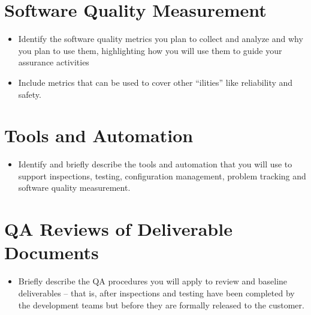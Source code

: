 \documentclass[11pt]{report}
\begin{document}
\chapter{Software Quality Measurement}
\begin{itemize}
\item Identify the software quality metrics you plan to collect and analyze and why you plan to use
  them, highlighting how you will use them to guide your assurance activities
\item Include metrics that can be used to cover other “ilities” like reliability and safety.
\end{itemize}



\chapter{Tools and Automation}
\begin{itemize}
\item Identify and briefly describe the tools and automation that you will use to support
  inspections, testing, configuration management, problem tracking and software quality measurement.
\end{itemize}



\chapter{QA Reviews of Deliverable Documents}
\begin{itemize}
\item Briefly describe the QA procedures you will apply to review and baseline deliverables – that
  is, after inspections and testing have been completed by the development teams but before they are
  formally released to the customer.
\end{itemize}



\end{document}
